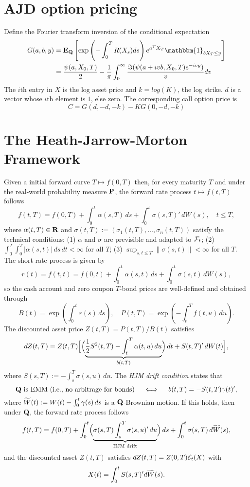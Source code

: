 \documentclass[twocolumn]{amsart}
\begin{document}
\section*{AJD option pricing}
Define the Fourier transform inversion of the conditional expectation
\begin{align*}
G(a,b,y) &= \EQ\left[\exp\left(-\int_0^{T}R(X_s)ds\right)e^{a^TX_T}\mathbbm{1}_{bX_T\leq y}\right]\\
&=\frac{\psi(a,X_0,T)}{2}-\frac{1}{\pi}\int_0^{\infty}\frac{\Im(\psi(a+ivb,X_0,T)e^{-ivy})}{v}dv
\end{align*}
The $i$th entry in $X$ is the log asset price and $k=log(K)$, the log strike. $d$ is a vector whose $i$th element is $1$, else zero. The corresponding call option price is
\begin{equation*}
C=G(d,-d,-k)-KG(0,-d,-k)
\end{equation*}
\section*{The Heath-Jarrow-Morton Framework}

Given a initial forward curve $T \mapsto f(0,T)$ then, for every maturity $T$  and under the real-world probability measure $\P$, the forward rate process $t \mapsto f(t,T)$ follows
\begin{equation*}
    f(t,T) = f(0,T) + \int_0^t \alpha(s,T)\,ds + \int_0^t \sigma(s,T)'\,dW(s), \quad t \le T,
\end{equation*}
where $\alpha(t,T) \in \R$ and $\sigma(t,T) := (\sigma_1(t,T), \ldots, \sigma_n(t,T))$ satisfy the technical conditions: (1) $\alpha$ and $\sigma$ are previsible and adapted to $\F_t$; (2) $\int_0^T\int_0^T |\alpha(s,t)|\,ds\,dt < \infty$ for all $T$; (3) $\sup_{s,t \le T} \|\sigma(s,t)\| < \infty$ for all $T$. The short-rate process is given by
\begin{equation*}
    r(t) = f(t,t) = f(0,t) + \int_0^t\alpha(s,t)\,ds + \int_0^t \sigma(s,t)\,dW(s),
\end{equation*}
so the cash account and zero coupon $T$-bond prices are well-defined and obtained through
\[
B(t) = \exp\left(\int_0^tr(s)\,ds\right), \quad P(t,T) = \exp\left(-\int_t^Tf(t,u)\,du\right).
\]
The discounted asset price $Z(t,T) = P(t,T)/B(t)$ satisfies
\[
    dZ(t,T) = Z(t,T)\Bigl[\Bigl(\underbrace{\frac12 S^2(t,T) - \int_t^T \alpha(t,u)\,du}_{b(t,T)}\Bigr)\,dt + S(t,T)'\,dW(t)\Bigr],
\]
where $S(s,T) := - \int_s^T \sigma(s,u)\,du$. The \emph{HJM drift condition} states that
\[
    \text{$\Q$ is EMM (i.e., no arbitrage for bonds)} \quad \iff \quad b(t,T) = -S(t,T) \gamma(t)',
\]
where $\tW(t):= W(t) - \int_0^t\gamma(s)\,ds$ is a $\Q$-Brownian motion. If this holds, then under $\Q$, the forward rate process follows
\[
    f(t,T) = f(0,T) + \int_0^t \Bigl(\underbrace{\sigma(s,T)\int_s^T\sigma(s,u)'\,du}_{\text{HJM drift}} \Bigr)\,ds + \int_0^t \sigma(s,T)\,d\tW(s),
\]
and the discounted asset $Z(t,T)$ satisfies $dZ(t,T) = Z(0,T) \sE_t(X)$ with $$X(t) = \int_0^t S(s,T)'d\tW(s).$$
\end{document}
